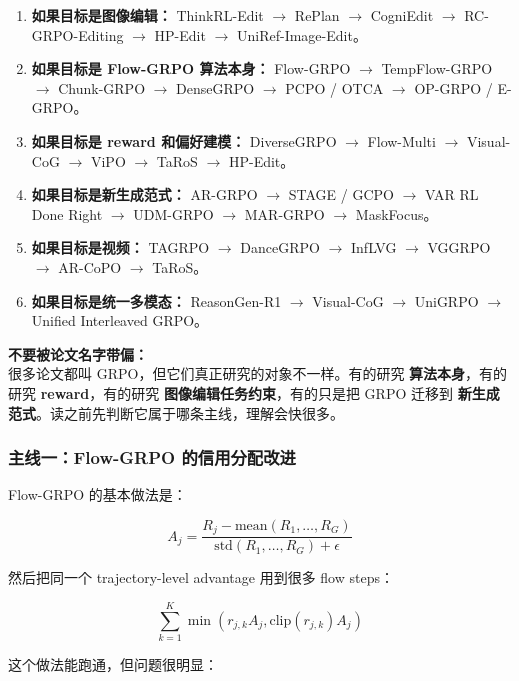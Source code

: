 \begin{enumerate}[leftmargin=1.5em]
  \item \textbf{如果目标是图像编辑：} ThinkRL-Edit $\rightarrow$ RePlan $\rightarrow$ CogniEdit $\rightarrow$ RC-GRPO-Editing $\rightarrow$ HP-Edit $\rightarrow$ UniRef-Image-Edit。
  \item \textbf{如果目标是 Flow-GRPO 算法本身：} Flow-GRPO $\rightarrow$ TempFlow-GRPO $\rightarrow$ Chunk-GRPO $\rightarrow$ DenseGRPO $\rightarrow$ PCPO / OTCA $\rightarrow$ OP-GRPO / E-GRPO。
  \item \textbf{如果目标是 reward 和偏好建模：} DiverseGRPO $\rightarrow$ Flow-Multi $\rightarrow$ Visual-CoG $\rightarrow$ ViPO $\rightarrow$ TaRoS $\rightarrow$ HP-Edit。
  \item \textbf{如果目标是新生成范式：} AR-GRPO $\rightarrow$ STAGE / GCPO $\rightarrow$ VAR RL Done Right $\rightarrow$ UDM-GRPO $\rightarrow$ MAR-GRPO $\rightarrow$ MaskFocus。
  \item \textbf{如果目标是视频：} TAGRPO $\rightarrow$ DanceGRPO $\rightarrow$ InfLVG $\rightarrow$ VGGRPO $\rightarrow$ AR-CoPO $\rightarrow$ TaRoS。
  \item \textbf{如果目标是统一多模态：} ReasonGen-R1 $\rightarrow$ Visual-CoG $\rightarrow$ UniGRPO $\rightarrow$ Unified Interleaved GRPO。
\end{enumerate}

\begin{warnbox}
\textbf{不要被论文名字带偏：}\\
很多论文都叫 GRPO，但它们真正研究的对象不一样。有的研究 \textbf{算法本身}，有的研究 \textbf{reward}，有的研究 \textbf{图像编辑任务约束}，有的只是把 GRPO 迁移到 \textbf{新生成范式}。读之前先判断它属于哪条主线，理解会快很多。
\end{warnbox}

\subsubsection{主线一：Flow-GRPO 的信用分配改进}

Flow-GRPO 的基本做法是：

\[
A_j
=
\frac{
R_j-\text{mean}(R_1,\ldots,R_G)
}{
\text{std}(R_1,\ldots,R_G)+\epsilon
}
\]

然后把同一个 trajectory-level advantage 用到很多 flow steps：

\[
\sum_{k=1}^{K}
\min
\left(
r_{j,k}A_j,
\text{clip}(r_{j,k})A_j
\right)
\]

这个做法能跑通，但问题很明显：

